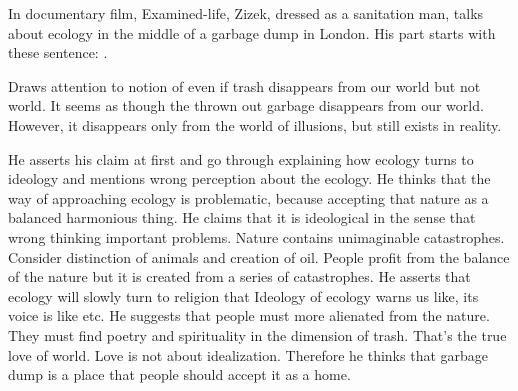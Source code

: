 
In documentary film, Examined-life, Zizek, dressed as a sanitation man, talks about ecology in the middle of a garbage dump in London. His part starts with these sentence: . 

Draws attention to notion of even if trash disappears from our world but not world. It seems as though the thrown out garbage disappears from our world. However, it disappears only from the world of illusions, but still exists in reality. 

He asserts his claim at first and go through explaining how ecology turns to ideology and mentions wrong perception about the ecology. He thinks that the way of approaching ecology is problematic, because accepting that nature as a balanced harmonious thing. He claims that it is ideological in the sense that wrong thinking important problems. Nature contains unimaginable catastrophes. Consider distinction of animals and creation of oil. People profit from the balance of the nature but it is created from a series of catastrophes. He asserts that ecology will slowly turn to religion that  Ideology of ecology warns us like,  its voice is like  etc. He suggests that people must more alienated from the nature. They must find poetry and spirituality in the dimension of trash. That's the true love of world. Love is not about idealization. Therefore he thinks that garbage dump is a place that people should accept it as a home.

 \cite{vafin2012zizek}

